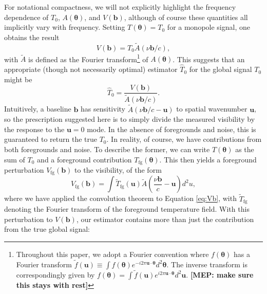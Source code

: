 \documentclass[twocolumn,apj,numberedappendix]{emulateapj}
\newcommand{\mep}[1]{{\color{applegreen} \textbf{[MEP:  #1]}}}
\begin{document}
For notational compactness, we will not explicitly highlight the frequency dependence of $T_0$, $A(\boldsymbol{\theta})$, and $V(\mathbf{b})$, although of course these quantities all implicitly vary with frequency. Setting $T(\boldsymbol \theta) = T_0$ for a monopole signal, one obtains the result
\begin{equation}
\label{eq:blMonoResponse}
V(\mathbf{b}) = T_0 \widetilde{A} \left( \nu \mathbf{b} / c \right),
\end{equation}
with $\widetilde{A}$ is defined as the Fourier transform\footnote{Throughout this paper, we adopt a Fourier convention where $f(\boldsymbol \theta)$ has a Fourier transform $\widetilde{f}(\mathbf{u}) \equiv \int f(\boldsymbol \theta) e^{-i 2 \pi \mathbf{u} \cdot \boldsymbol \theta  } d^2 \boldsymbol \theta.$ The inverse transform is correspondingly given by $f(\boldsymbol \theta) = \int \widetilde{f}(\mathbf{u}) e^{i 2 \pi \mathbf{u} \cdot \boldsymbol \theta  }d^2 \mathbf{u}.$ \mep{make sure this stays with rest}} of $A(\boldsymbol \theta)$. This suggests that an appropriate (though not necessarily optimal) estimator $\widehat{T}_0$ for the global signal $T_0$ might be
\begin{equation}
\label{eq:singleBlSillyEst}
\widehat{T}_0 = \frac{V( \mathbf{b})}{\widetilde{A} \left( \nu \mathbf{b} / c \right)}.
\end{equation}
Intuitively, a baseline $\mathbf{b}$ has sensitivity $\widetilde{A} \left( \nu \mathbf{b} / c - \mathbf{u} \right)$ to spatial wavenumber $\mathbf{u}$, so the prescription suggested here is to simply divide the measured visibility by the response to the $\mathbf{u}=0$ mode. In the absence of foregrounds and noise, this is guaranteed to return the true $T_0$.  In reality, of course, we have contributions from both foregrounds and noise.  To describe the former, we can write $T(\boldsymbol \theta)$ as the sum of $T_0$ and a foreground contribution $T_\textrm{fg} (\boldsymbol \theta)$.  This then yields a foreground perturbation $V_\textrm{fg} (\mathbf{b})$ to the visibility, of the form
\begin{equation}
V_\textrm{fg} (\mathbf{b}) = \int  \widetilde{T}_\textrm{fg} (\mathbf{u}) \widetilde{A} \left( \frac{\nu \mathbf{b}}{c} - \mathbf{u} \right) d^2 u,
\end{equation}
where we have applied the convolution theorem to Equation \eqref{eq:Vb}, with $\widetilde{T}_\textrm{fg}$ denoting the Fourier transform of the foreground temperature field.  With this perturbation to $V(\mathbf{b})$, our estimator contains more than just the contribution from the true global signal:
\end{document}
